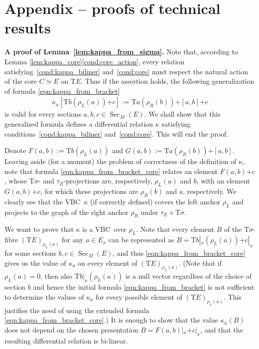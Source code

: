 \documentclass[pdftex]{sigma}
\newcommand{\ZM}{{VBC}} %
\newcommand{\Sec}{\operatorname{Sec}}
\newcommand{\plus}{\boldsymbol{\pmb{+}}}
\newcommand{\rhoL}{\rho_L} %
\newcommand{\rhoR}{\rho_R}
\newcommand{\T}{\mathrm{T}} %
\numberwithin{equation}{section}
\theoremstyle{definition}
\begin{document}
\appendix

\section{Appendix -- proofs of technical results}\label{sec:app}

{\bf A proof of Lemma~\ref{lem:kappa_from_sigma}.} %
Note that, according to Lemma \ref{lem:kappa_core}\eqref{cond:core_action}, every relation satisfying~\eqref{cond:kappa_biliner} and~\eqref{cond:core} must respect the natural action of the core $C\simeq E$ on $\T E$. Thus if the assertion holds, the following generalization of formula \eqref{eqn:kappa_from_bracket}
\begin{gather}\label{eqn:kappa_from_bracket_core}
\kappa_a\left[\T b(\rhoL(a))\plus c\right]:=\T a(\rhoR(b))\plus [a,b]\plus c
\end{gather}
is valid for every sections $a,b,c\in\Sec_M(E)$. We shall show that this generalized formula defines a differential relation $\kappa$ satisfying conditions~\eqref{cond:kappa_biliner} and~\eqref{cond:core}. This will end the proof.

Denote $F(a,b):=\T b(\rhoL(a))$ and $G(a,b):=\T a(\rhoR(b))\plus [a,b]$. Leaving aside (for a moment) the problem of correctness of the definition of $\kappa$, note that formula \eqref{eqn:kappa_from_bracket_core} relates an element $F(a,b)\plus c$, whose $\T\sigma$- and $\tau_E$-projections are, respectively, $\rhoL(a)$ and $b$, with an element $G(a,b)\plus c$, for which these projections are $\rhoR(b)$ and $a$, respectively. We clearly see that the \ZM\ $\kappa$ (if correctly defined) covers the left anchor $\rhoL$ and projects to the graph of the right anchor $\rhoR$ under $\tau_E\times\T\sigma$.

We want to prove that $\kappa$ is a \ZM\ over $\rhoL$. Note that every element $B$ of the $\T\sigma$-fibre $(\T E)_{\rhoL(a)}$ for any $a\in E_x$ can be represented as $B=\T b|_x(\rhoL(a))\plus c|_x$ for some sections $b,c\in \Sec_M(E)$, and thus \eqref{eqn:kappa_from_bracket_core} gives us the value of $\kappa_a$ on every element of $(\T E)_{\rhoL(a)}$. (Note that if $\rhoL(a)=0$, then also $\T b|_x(\rhoL(a))$ is a null vector regardless of the choice of section $b$ and hence the initial formula \eqref{eqn:kappa_from_bracket} is not sufficient to determine the values of $\kappa_a$ for every possible element of $(\T E)_{\rhoL(a)}$. This justifies the need of using the extended formula \eqref{eqn:kappa_from_bracket_core}.) It is enough to show that the value $\kappa_a(B)$ does not depend on the chosen presentation $B=F(a,b)|_x\plus c|_x${,} and that the resulting differential relation is bi-linear.
\end{document}
